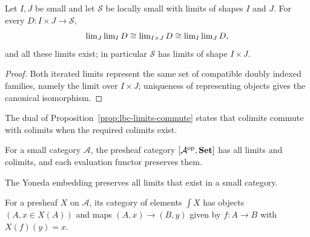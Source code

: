 \begin{proposition}
\label{prop:lbc-limits-commute}
Let $I,J$ be small and let $\mathcal S$ be locally small with limits of shapes
$I$ and $J$. For every $D:I\times J\to\mathcal S$,
\[\operatorname{lim}_J\operatorname{lim}_I D\cong\operatorname{lim}_{I\times J}D\cong\operatorname{lim}_I\operatorname{lim}_J D,\]
and all these limits exist; in particular $\mathcal S$ has limits of shape
$I\times J$.
\end{proposition}
\begin{proof}
Both iterated limits represent the same set of compatible doubly indexed
families, namely the limit over $I\times J$; uniqueness of representing objects
gives the canonical isomorphism.
\end{proof}

\begin{warning}
\label{warn:lbc-colimits-commute}
The dual of Proposition~\ref{prop:lbc-limits-commute} states that colimits
commute with colimits when the required colimits exist.
\end{warning}

\begin{corollary}
\label{cor:lbc-presheaf-all-limits}
For a small category $\mathcal A$, the presheaf category
$[\mathcal A^{\mathrm{op}},\mathbf{Set}]$ has all limits and colimits, and each evaluation
functor preserves them.
\end{corollary}

\begin{corollary}
\label{cor:lbc-yoneda-preserves-limits}
The Yoneda embedding preserves all limits that exist in a small category.
\end{corollary}

\begin{definition}
\label{def:lbc-category-elements}
For a presheaf $X$ on $\mathcal A$, its category of elements $\int X$ has
objects $(A,x\in X(A))$ and maps $(A,x)\to(B,y)$ given by $f:A\to B$ with
$X(f)(y)=x$.
\end{definition}

